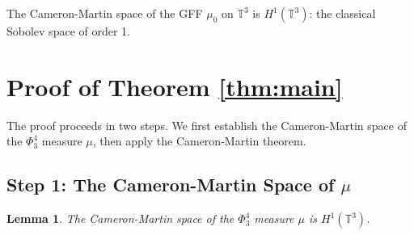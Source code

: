 \documentclass[12pt]{article}
\newtheorem{lemma}{Lemma}
\theoremstyle{definition}
\begin{document}
The Cameron-Martin space of the GFF $\mu_0$ on $\mathbb{T}^3$ is $H^1(\mathbb{T}^3)$: the classical Sobolev space of order 1.

\section{Proof of Theorem \ref{thm:main}}

The proof proceeds in two steps. We first establish the Cameron-Martin space of the $\Phi^4_3$ measure $\mu$, then apply the Cameron-Martin theorem.

\subsection{Step 1: The Cameron-Martin Space of $\mu$}

\begin{lemma}\label{lem:CM-phi4}
The Cameron-Martin space of the $\Phi^4_3$ measure $\mu$ is $H^1(\mathbb{T}^3)$.
\end{lemma}
\end{document}
